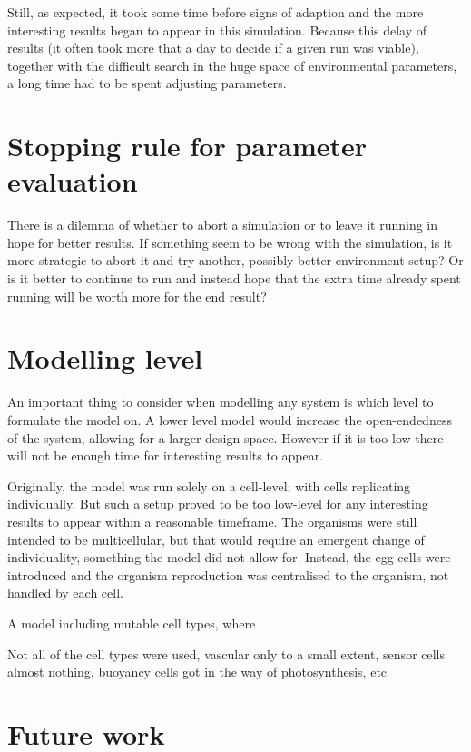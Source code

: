 
Still, as expected, it took some time before signs of adaption and the more interesting results began to appear in this simulation. Because this delay of results (it often took more that a day to decide if a given run was viable), together with the difficult search in the huge space of environmental parameters, a long time had to be spent adjusting parameters.

\section{Stopping rule for parameter evaluation}
There is a dilemma of whether to abort a simulation or to leave it running in hope for better results. If something seem to be wrong with the simulation, is it more strategic to abort it and try another, possibly better environment setup? Or is it better to continue to run and instead hope that the extra time already spent running will be worth more for the end result?

\section{Modelling level}
An important thing to consider when modelling any system is which level to formulate the model on. A lower level model would increase the open-endedness of the system, allowing for a larger design space. However if it is too low there will not be enough time for interesting results to appear.

Originally, the model was run solely on a cell-level; with cells replicating individually. But such a setup proved to be too low-level for any interesting results to appear within a reasonable timeframe. The organisms were still intended to be multicellular, but that would require an emergent change of individuality, something the model did not allow for. Instead, the egg cells were introduced and the organism reproduction was centralised to the organism, not handled by each cell.

A model including mutable cell types, where 

Not all of the cell types were used, vascular only to a small extent, sensor cells almost nothing, buoyancy cells got in the way of photosynthesis, etc

\section{Future work} %

